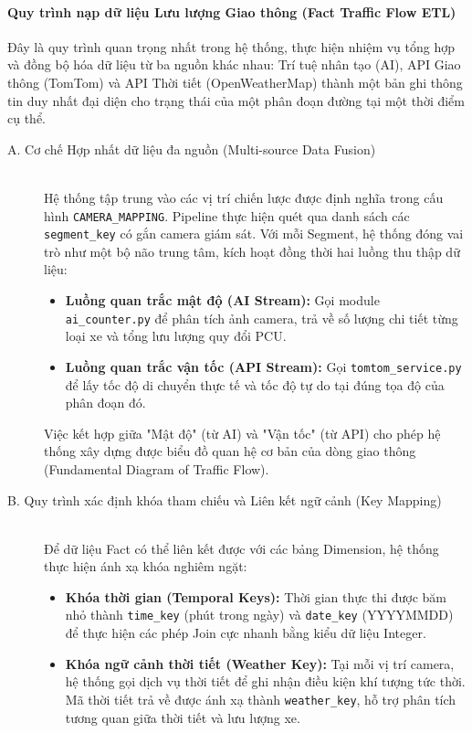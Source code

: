 \paragraph{ Quy trình nạp dữ liệu Lưu lượng Giao thông (Fact Traffic Flow ETL)}

Đây là quy trình quan trọng nhất trong hệ thống, thực hiện nhiệm vụ tổng hợp và đồng bộ hóa dữ liệu từ ba nguồn khác nhau: Trí tuệ nhân tạo (AI), API Giao thông (TomTom) và API Thời tiết (OpenWeatherMap) thành một bản ghi thông tin duy nhất đại diện cho trạng thái của một phân đoạn đường tại một thời điểm cụ thể.

\begin{description}
    \item[A. Cơ chế Hợp nhất dữ liệu đa nguồn (Multi-source Data Fusion)] \hfill \\
    Hệ thống tập trung vào các vị trí chiến lược được định nghĩa trong cấu hình \texttt{CAMERA\_MAPPING}. Pipeline thực hiện quét qua danh sách các \texttt{segment\_key} có gắn camera giám sát. Với mỗi Segment, hệ thống đóng vai trò như một bộ não trung tâm, kích hoạt đồng thời hai luồng thu thập dữ liệu:
    \begin{itemize}
        \item \textbf{Luồng quan trắc mật độ (AI Stream):} Gọi module \texttt{ai\_counter.py} để phân tích ảnh camera, trả về số lượng chi tiết từng loại xe và tổng lưu lượng quy đổi PCU.
        \item \textbf{Luồng quan trắc vận tốc (API Stream):} Gọi \texttt{tomtom\_service.py} để lấy tốc độ di chuyển thực tế và tốc độ tự do tại đúng tọa độ của phân đoạn đó.
    \end{itemize}
    Việc kết hợp giữa "Mật độ" (từ AI) và "Vận tốc" (từ API) cho phép hệ thống xây dựng được biểu đồ quan hệ cơ bản của dòng giao thông (Fundamental Diagram of Traffic Flow).

    \item[B. Quy trình xác định khóa tham chiếu và Liên kết ngữ cảnh (Key Mapping)] \hfill \\
    Để dữ liệu Fact có thể liên kết được với các bảng Dimension, hệ thống thực hiện ánh xạ khóa nghiêm ngặt:
    \begin{itemize}
        \item \textbf{Khóa thời gian (Temporal Keys):} Thời gian thực thi được băm nhỏ thành \texttt{time\_key} (phút trong ngày) và \texttt{date\_key} (YYYYMMDD) để thực hiện các phép Join cực nhanh bằng kiểu dữ liệu Integer.
        \item \textbf{Khóa ngữ cảnh thời tiết (Weather Key):} Tại mỗi vị trí camera, hệ thống gọi dịch vụ thời tiết để ghi nhận điều kiện khí tượng tức thời. Mã thời tiết trả về được ánh xạ thành \texttt{weather\_key}, hỗ trợ phân tích tương quan giữa thời tiết và lưu lượng xe.
    \end{itemize}
\end{description}

